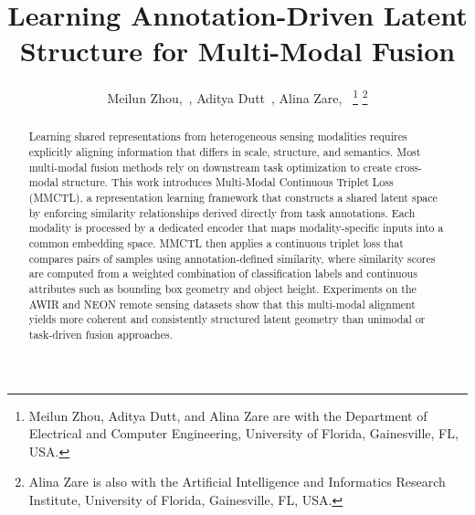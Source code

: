 \documentclass[lettersize,journal]{IEEEtran}
\begin{document}
\title{Learning Annotation-Driven Latent Structure for Multi-Modal Fusion}

\author{
Meilun Zhou,~,
Aditya Dutt~,
Alina Zare,~%
\thanks{
Meilun Zhou, Aditya Dutt, and Alina Zare are with the Department of Electrical and Computer Engineering, University of Florida, Gainesville, FL, USA.
}%
\thanks{
Alina Zare is also with the Artificial Intelligence and Informatics Research Institute, University of Florida, Gainesville, FL, USA.
}%
}






\maketitle

\begin{abstract}
Learning shared representations from heterogeneous sensing modalities requires explicitly aligning information that differs in scale, structure, and semantics. Most multi-modal fusion methods rely on downstream task optimization to create cross-modal structure. This work introduces Multi-Modal Continuous Triplet Loss (MMCTL), a representation learning framework that constructs a shared latent space by enforcing similarity relationships derived directly from task annotations. Each modality is processed by a dedicated encoder that maps modality-specific inputs into a common embedding space. MMCTL then applies a continuous triplet loss that compares pairs of samples using annotation-defined similarity, where similarity scores are computed from a weighted combination of classification labels and continuous attributes such as bounding box geometry and object height. Experiments on the AWIR and NEON remote sensing datasets show that this multi-modal alignment yields more coherent and consistently structured latent geometry than unimodal or task-driven fusion approaches.
\end{abstract}
\end{document}
